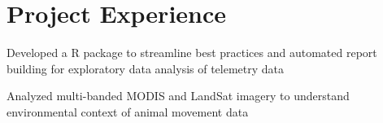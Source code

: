 \documentclass[]{deedy-resume-openfont}
\begin{document}
\begin{minipage}[t]{0.66\textwidth}
\section{Project Experience}
\location{} %
\begin{tightemize}
\item Developed a R package to streamline best practices and automated report building for exploratory data analysis of telemetry data
\href{https://www.danaseidel.com/stmove}{\faGlobe} %
\item Analyzed multi-banded MODIS and LandSat imagery to understand environmental context of animal movement data
\end{tightemize}


\end{minipage}
\end{document}
